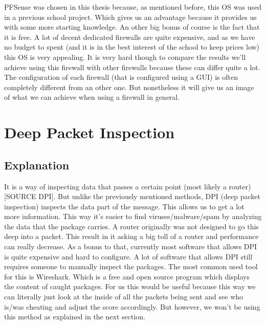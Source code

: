 PFSense was chosen in this thesis because, as mentioned before, this OS was used in a previous school project. Which gives us an advantage because it provides us with some more starting knowledge. An other big bonus of course is the fact that it is free. A lot of decent dedicated firewalls are quite expensive, and as we have no budget to spent (and it is in the best interest of the school to keep prices low) this OS is very appealing. It is very hard though to compare the results we'll achieve using this firewall with other firewalls because these can differ quite a lot. The configuration of each firewall (that is configured using a GUI) is often completely different from an other one. But nonetheless it will give us an image of what we can achieve when using a firewall in general.

\section{Deep Packet Inspection}
\subsection{Explanation}
It is a way of inspecting data that passes a certain point (most likely a router) [SOURCE DPI]. But unlike the previously mentioned methods, DPI (deep packet inspection) inspects the data part of the message. This allows us to get a lot more information. This way it's easier to find viruses/malware/spam by analyzing the data that the package carries. A router originally was not designed to go this deep into a packet. This result in it asking a big toll of a router and performance can really decrease. As a bonus to that, currently most software that allows DPI is quite expensive and hard to configure. A lot of software that allows DPI still requires someone to manually inspect the packages. The most common used tool for this is Wireshark. Which is a free and open source program which displays the content of caught packages.
For us this would be useful because this way we can literally just look at the inside of all the packets being sent and see who is/was cheating and adjust the score accordingly. But however, we won't be using this method as explained in the next section.
